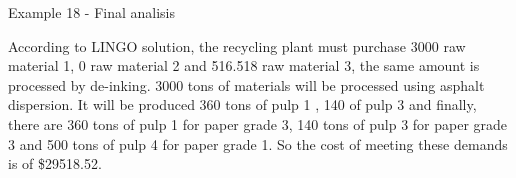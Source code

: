 \begin{frame}{Example 18 - Final analisis}

According to LINGO solution, the recycling plant must purchase 3000 raw material 1, 0 raw material 2
and 516.518 raw material 3, the same amount is processed by de-inking. 3000 tons of materials will be processed
using asphalt dispersion. It will be produced 360 tons of pulp 1 , 140 of pulp 3 and finally, there are
360 tons of pulp 1 for paper grade 3, 140 tons of pulp 3 for paper grade 3 and 500 tons of pulp 4
for paper grade 1. So the cost of meeting these demands is of \$29518.52.

\end{frame}
